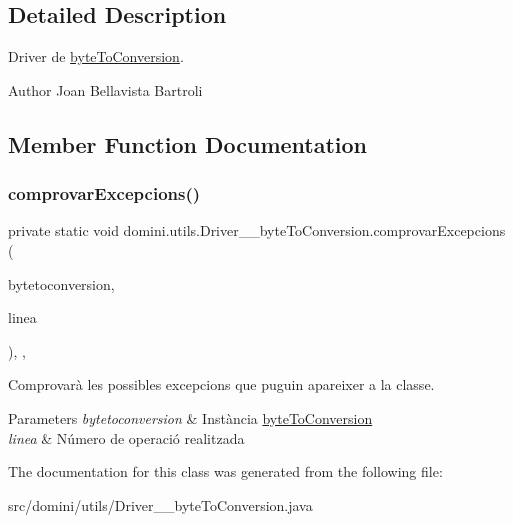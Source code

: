 \subsection{Detailed Description}
Driver de \hyperlink{classdomini_1_1utils_1_1byteToConversion}{byte\+To\+Conversion}. 

\begin{DoxyAuthor}{Author}
Joan Bellavista Bartroli 
\end{DoxyAuthor}


\subsection{Member Function Documentation}
\mbox{\label{classdomini_1_1utils_1_1Driver____byteToConversion_a82c589da57bedb139b9254c8623a7fd4}} 
\subsubsection{\texorpdfstring{comprovar\+Excepcions()}{comprovarExcepcions()}}
{\footnotesize\ttfamily private static void domini.\+utils.\+Driver\+\_\+\+\_\+byte\+To\+Conversion.\+comprovar\+Excepcions (\begin{DoxyParamCaption}\item[{\hyperlink{classdomini_1_1utils_1_1byteToConversion}{byte\+To\+Conversion}}]{bytetoconversion,  }\item[{String}]{linea }\end{DoxyParamCaption})\hspace{0.3cm}{\ttfamily [inline]}, {\ttfamily [static]}, {\ttfamily [private]}}



Comprovarà les possibles excepcions que puguin apareixer a la classe. 


\begin{DoxyParams}{Parameters}
{\em bytetoconversion} & Instància \hyperlink{classdomini_1_1utils_1_1byteToConversion}{byte\+To\+Conversion} \\
\hline
{\em linea} & Número de operació realitzada \\
\hline
\end{DoxyParams}


The documentation for this class was generated from the following file\+:\begin{DoxyCompactItemize}
\item 
src/domini/utils/Driver\+\_\+\+\_\+byte\+To\+Conversion.\+java\end{DoxyCompactItemize}
